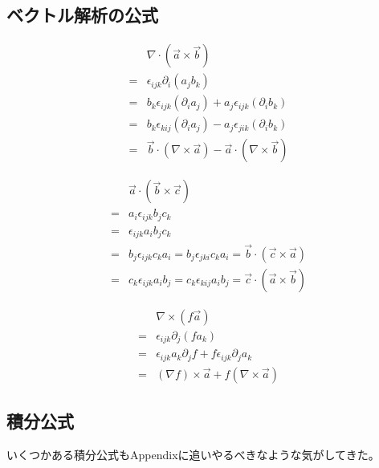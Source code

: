 \subsection{ベクトル解析の公式}


\begin{align}
&\nabla\cdot\left(\vec{a}\times\vec{b}\right)\\
=&\epsilon_{ijk}\partial_i\left(a_jb_k\right)\\
=&b_k\epsilon_{ijk}\left(\partial_ia_j\right)
 +a_j\epsilon_{ijk}\left(\partial_ib_k\right)\\
=&b_k\epsilon_{kij}\left(\partial_ia_j\right)
 -a_j\epsilon_{jik}\left(\partial_ib_k\right)\\
=&\vec{b}\cdot\left(\nabla\times\vec{a}\right)
 -\vec{a}\cdot\left(\nabla\times\vec{b}\right)
\end{align}

\begin{align}
&\vec{a}\cdot\left(\vec{b}\times\vec{c}\right)\\
=&a_i\epsilon_{ijk}b_jc_k\\
=&\epsilon_{ijk}a_ib_jc_k\\
=&b_j\epsilon_{ijk}c_ka_i=b_j\epsilon_{jki}c_ka_i
 =\vec{b}\cdot\left(\vec{c}\times\vec{a}\right)\\
=&c_k\epsilon_{ijk}a_ib_j=c_k\epsilon_{kij}a_ib_j
 =\vec{c}\cdot\left(\vec{a}\times\vec{b}\right)
\end{align}

\begin{align}
&\nabla\times\left(f\vec{a}\right)\\
=&\epsilon_{ijk}\partial_j\left(fa_k\right)\\
=&\epsilon_{ijk}a_k\partial_jf+f\epsilon_{ijk}\partial_ja_k\\
=&\left(\nabla f\right)\times\vec{a}+f\left(\nabla\times\vec{a}\right)
\end{align}

\subsection{積分公式}

いくつかある積分公式もAppendixに追いやるべきなような気がしてきた。

